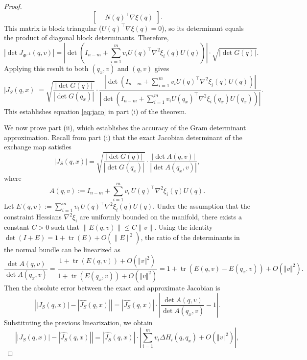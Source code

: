 \documentclass[12pt]{article}
\begin{document}
\begin{proof}
\[\begin{bmatrix}
&
N(q)^\top \nabla\xi(q)
\end{bmatrix}.
\]
This matrix is block triangular ($U(q)^\top \nabla\xi(q)=0$), so its determinant equals the product of diagonal block determinants. Therefore,
\[
|\det J_{\Phi^{-1}}(q,v)|
=
\left|
\det\!\left(
I_{n-m}
+
\sum_{i=1}^m v_i U(q)^\top \nabla^2\xi_i(q) U(q)
\right)
\right|
\cdot
\sqrt{|\det G(q)|}.
\]
Applying this result to both $(q_x,v)$ and $(q,v)$ gives
\[
|J_S(q,x)|
=\sqrt{\frac{|\det G(q)|}{|\det G(q_x)|}}
\cdot
\frac{
\left|
\det\!\left(
I_{n-m}
+
\sum_{i=1}^m v_i U(q)^\top \nabla^2\xi_i(q) U(q)
\right)
\right|
}{
\left|
\det\!\left(
I_{n-m}
+
\sum_{i=1}^m v_i U(q_x)^\top \nabla^2\xi_i(q_x) U(q_x)
\right)
\right|
}.
\]
This establishes equation \eqref{eq:jaco} in part (i) of the theorem.

We now prove part (ii), which establishes the accuracy of the Gram determinant approximation.
Recall from part (i) that the exact Jacobian determinant of the exchange map satisfies
\begin{equation}\nonumber
|J_S(q,x)|
=
\sqrt{\frac{|\det G(q)|}{|\det G(q_x)|}}
\cdot
\frac{|\det A(q,v)|}{|\det A(q_x,v)|},
\end{equation}
where 
\begin{equation}\nonumber A(q,v) := I_{n-m} + \sum_{i=1}^m v_i\, U(q)^\top \nabla^2\xi_i(q) U(q). \end{equation}
Let $E(q,v) := \sum_{i=1}^m v_i\, U(q)^\top \nabla^2\xi_i(q) U(q)$. Under the assumption that the constraint Hessians $\nabla^2\xi_i$ are uniformly bounded on the manifold, there exists a constant $C > 0$ such that $\|E(q,v)\| \le C \|v\|$. Using the identity $\det(I + E) = 1 + \operatorname{tr}(E) + O(\|E\|^2)$, the ratio of the determinants in the normal bundle can be linearized as
\begin{equation}\nonumber
\frac{\det A(q,v)}{\det A(q_x,v)} = \frac{1 + \operatorname{tr}(E(q,v)) + O(\Vert v\Vert^2)}{1 + \operatorname{tr}(E(q_x,v)) + O(\Vert v\Vert^2)}  = 1 + \operatorname{tr}(E(q,v) - E(q_x,v)) + O(\Vert v\Vert^2).\end{equation}
Then the absolute error between the exact and approximate Jacobian is
\begin{equation}\nonumber
\left| |J_S(q,x)| - |\widehat{J_S}(q,x)| \right| = |\widehat{J_S}(q,x)| \cdot \left| \frac{\det A(q,v)}{\det A(q_x,v)} - 1 \right|.
\end{equation}
Substituting the previous linearization, we obtain
\begin{equation}\nonumber
\left| |J_S(q,x)| - |\widehat{J_S}(q,x)| \right| = |\widehat{J_S}(q,x)| \cdot \left| \sum_{i=1}^m v_i \Delta H_i(q, q_x) + O(\Vert v\Vert^2) \right|,

\end{equation}
\end{proof}
\end{document}
